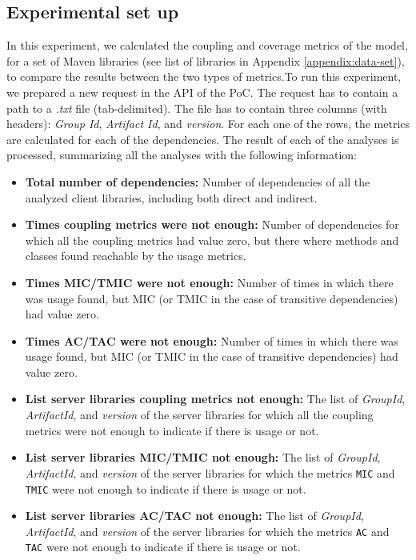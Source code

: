 \subsection{Experimental set up}
In this experiment, we calculated the coupling and coverage metrics of the model, for a set of Maven libraries (see list of libraries in Appendix \ref{appendix:data-set}), to compare the results between the two types of metrics.To run this experiment, we prepared a new request in the API of the PoC. The request has to contain a path to a \textit{.txt} file (tab-delimited). The file has to contain three columns (with headers): \textit{Group Id}, \textit{Artifact Id}, and \textit{version}. For each one of the rows, the metrics are calculated for each of the dependencies. The result of each of the analyses is processed, summarizing all the analyses with the following information:

\begin{itemize}
  \item \textbf{Total number of dependencies:} Number of dependencies of all the analyzed client libraries, including both direct and indirect.
  \item \textbf{Times coupling metrics were not enough:} Number of dependencies for which all the coupling metrics had value zero, but there where methods and classes found reachable by the usage metrics.
  \item \textbf{Times MIC/TMIC were not enough:} Number of times in which there was usage found, but MIC (or TMIC in the case of transitive dependencies) had value zero.
  \item \textbf{Times AC/TAC were not enough:} Number of times in which there was usage found, but MIC (or TMIC in the case of transitive dependencies) had value zero.
  \item \textbf{List server libraries coupling metrics not enough:} The list of \textit{GroupId}, \textit{ArtifactId}, and \textit{version} of the server libraries for which all the coupling metrics were not enough to indicate if there is usage or not.
  \item \textbf{List server libraries MIC/TMIC not enough:} The list of \textit{GroupId}, \textit{ArtifactId}, and \textit{version} of the server libraries for which the metrics \texttt{MIC} and \texttt{TMIC} were not enough to indicate if there is usage or not.
  \item \textbf{List server libraries AC/TAC not enough:} The list of \textit{GroupId}, \textit{ArtifactId}, and \textit{version} of the server libraries for which the metrics \texttt{AC} and \texttt{TAC} were not enough to indicate if there is usage or not.
\end{itemize}

